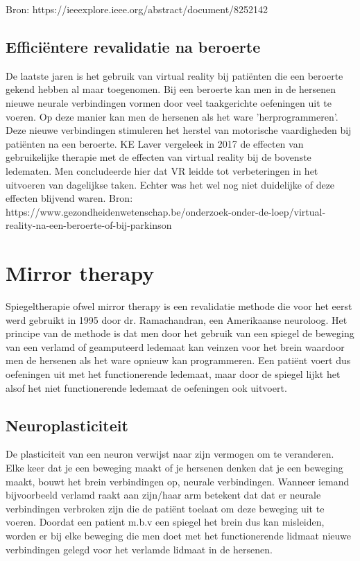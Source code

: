 Bron: https://ieeexplore.ieee.org/abstract/document/8252142



\subsection{Efficiëntere revalidatie na beroerte}  
De laatste jaren is het gebruik van virtual reality bij patiënten die een beroerte gekend hebben al maar toegenomen. Bij een beroerte kan men in de hersenen nieuwe neurale verbindingen vormen door veel taakgerichte oefeningen uit te voeren. Op deze manier kan men de hersenen als het ware 'herprogrammeren'. Deze nieuwe verbindingen stimuleren het herstel van motorische vaardigheden bij patiënten na een beroerte. KE Laver vergeleek in 2017 de effecten van gebruikelijke therapie met de effecten van virtual reality bij de bovenste ledematen. Men concludeerde hier dat VR leidde tot verbeteringen in het uitvoeren van dagelijkse taken. Echter was het wel nog niet duidelijke of deze effecten blijvend waren.
Bron: https://www.gezondheidenwetenschap.be/onderzoek-onder-de-loep/virtual-reality-na-een-beroerte-of-bij-parkinson

\section{Mirror therapy}
Spiegeltherapie ofwel mirror therapy is een revalidatie methode die voor het eerst werd gebruikt in 1995 door dr. Ramachandran, een Amerikaanse neuroloog. Het principe van de methode is dat men door het gebruik van een spiegel de beweging van een verlamd of geamputeerd ledemaat kan veinzen voor het brein waardoor men de hersenen als het ware opnieuw kan programmeren.
Een patiënt voert dus oefeningen uit met het functionerende ledemaat, maar door de spiegel lijkt het alsof het niet functionerende ledemaat de oefeningen ook uitvoert.

\subsection{Neuroplasticiteit}
De plasticiteit van een neuron verwijst naar zijn vermogen om te veranderen. Elke keer dat je een beweging maakt of je hersenen denken dat je een beweging maakt, bouwt het brein verbindingen op, neurale verbindingen. Wanneer iemand bijvoorbeeld verlamd raakt aan zijn/haar arm betekent dat dat er neurale verbindingen verbroken zijn die de patiënt toelaat om deze beweging uit te voeren. Doordat een patient m.b.v een spiegel het brein dus kan misleiden, worden er bij elke beweging die men doet met het functionerende lidmaat nieuwe verbindingen gelegd voor het verlamde lidmaat in de hersenen.

